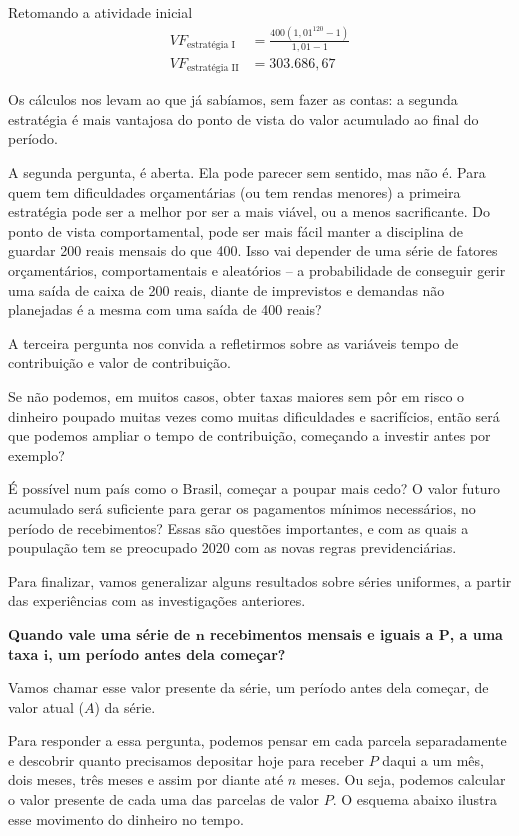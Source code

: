 \begin{example}{Retomando a atividade inicial}
\begin{align*}
\mathit{VF}_{\text{estratégia I}}&=\frac{400(1,01^{120}-1)}{1,01-1}\\
\mathit{VF}_{\text{estratégia II}}&=303.686,67
\end{align*}

Os cálculos nos levam ao que já sabíamos, sem fazer as contas: a segunda estratégia é mais vantajosa do ponto de vista do valor acumulado ao final do período.

A segunda pergunta, é aberta. Ela pode parecer sem sentido, mas não é. Para quem tem dificuldades orçamentárias (ou tem rendas menores) a primeira estratégia pode ser a melhor por ser a mais viável, ou a menos sacrificante. Do ponto de vista comportamental, pode ser mais fácil manter a disciplina de guardar 200 reais mensais do que 400. Isso vai depender de uma série de fatores orçamentários, comportamentais e aleatórios – a probabilidade de conseguir gerir uma saída de caixa de 200 reais, diante de imprevistos e demandas não planejadas é a mesma com uma saída de 400 reais?

A terceira pergunta nos convida a refletirmos sobre as variáveis tempo de contribuição e valor de contribuição. 
\end{example}

Se não podemos, em muitos casos, obter taxas maiores sem pôr em risco o dinheiro poupado muitas vezes como muitas dificuldades e sacrifícios, então será que podemos ampliar o tempo de contribuição, começando a investir antes por exemplo? 

É possível num país como o Brasil, começar a poupar mais cedo? O valor futuro acumulado será suficiente para gerar os pagamentos mínimos necessários, no período de recebimentos? Essas são questões importantes, e com as quais a poupulação tem se preocupado 2020 com as novas regras previdenciárias.

Para finalizar, vamos generalizar alguns resultados sobre séries uniformes, a partir das experiências com as investigações anteriores.

\textbf{Quando vale uma série de $\bm{n}$ recebimentos mensais e iguais a $\bm{P}$, a uma taxa $\bm{i}$, um período antes dela começar?}

Vamos chamar esse valor presente da série, um período antes dela começar, de valor atual ($A$) da série.

Para responder a essa pergunta, podemos pensar em cada parcela separadamente e descobrir quanto precisamos depositar hoje para receber $P$ daqui a um mês, dois meses, três meses e assim por diante até $n$ meses. Ou seja, podemos calcular o valor presente de cada uma das parcelas de valor $P$. O esquema abaixo ilustra esse movimento do dinheiro no tempo.

